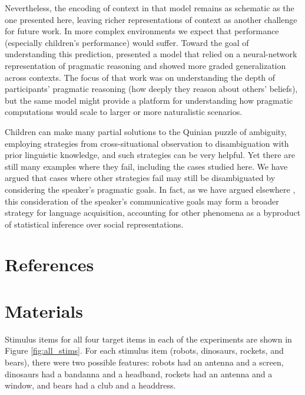 \documentclass[review]{elsarticle}
\begin{document}
Nevertheless, the encoding of context in that model remains as schematic as the one presented here, leaving richer representations of context as another challenge for future work. In more complex environments we expect that performance (especially children's performance) would suffer. Toward the goal of understanding this prediction, \citet{vogel2014} presented a model that relied on a neural-network representation of pragmatic reasoning and showed more graded generalization across contexts. The focus of that work was on understanding the depth of participants' pragmatic reasoning (how deeply they reason about others' beliefs), but the same model might provide a platform for understanding how pragmatic computations would scale to larger or more naturalistic scenarios. 

Children can make many partial solutions to the Quinian \citeyear{quine1960} puzzle of ambiguity, employing strategies from cross-situational observation to disambiguation with prior linguistic knowledge, and such strategies can be very helpful. Yet there are still many examples where they fail, including the cases studied here. We have argued that cases where other strategies fail may still be disambiguated by considering the speaker's pragmatic goals. In fact, as we have argued elsewhere \citep{frank2009}, this consideration of the speaker's communicative goals may form a broader strategy for language acquisition, accounting for other phenomena as a byproduct of statistical inference over social representations. 


\section*{References}



\appendix
\setcounter{figure}{0}

\section{Materials}

Stimulus items for all four target items in each of the experiments are shown in Figure \ref{fig:all_stims}. For each stimulus item (robots, dinosaurs, rockets, and bears), there were two possible features: robots had an antenna and a screen, dinosaurs had a bandanna and a headband, rockets had an antenna and a window, and bears had a club and a headdress.
\end{document}
